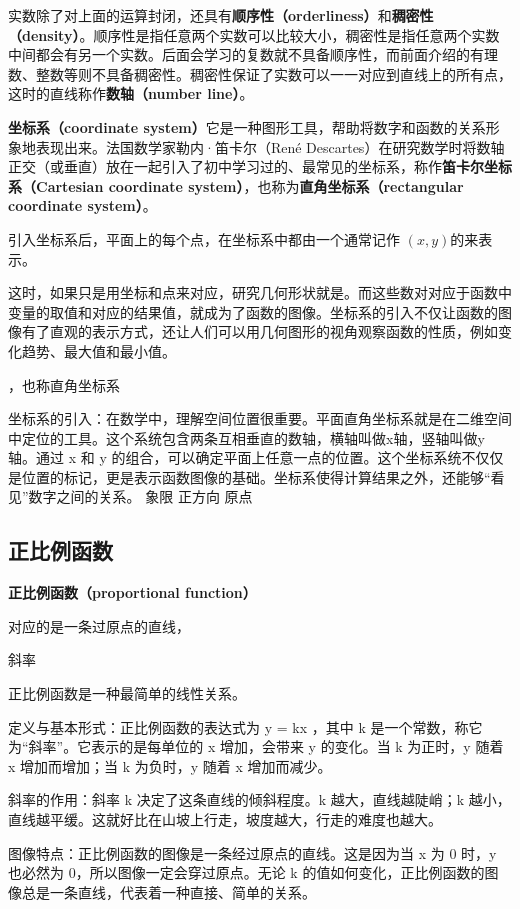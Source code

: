 实数除了对上面的运算封闭，还具有\textbf{顺序性（orderliness）}和\textbf{稠密性（density）}。顺序性是指任意两个实数可以比较大小，稠密性是指任意两个实数中间都会有另一个实数。后面会学习的复数就不具备顺序性，而前面介绍的有理数、整数等则不具备稠密性。稠密性保证了实数可以一一对应到直线上的所有点，这时的直线称作\textbf{数轴（number line）}。

\textbf{坐标系（coordinate system）}它是一种图形工具，帮助将数字和函数的关系形象地表现出来。法国数学家勒内·笛卡尔（René Descartes）在研究数学时将数轴正交（或垂直）放在一起引入了初中学习过的、最常见的坐标系，称作\textbf{笛卡尔坐标系（Cartesian coordinate system）}，也称为\textbf{直角坐标系（rectangular coordinate system）}。

引入坐标系后，平面上的每个点，在坐标系中都由一个通常记作 $(x, y)$的来表示。

这时，如果只是用坐标和点来对应，研究几何形状就是。而这些数对对应于函数中变量的取值和对应的结果值，就成为了函数的图像。坐标系的引入不仅让函数的图像有了直观的表示方式，还让人们可以用几何图形的视角观察函数的性质，例如变化趋势、最大值和最小值。

，也称直角坐标系


坐标系的引入：在数学中，理解空间位置很重要。平面直角坐标系就是在二维空间中定位的工具。这个系统包含两条互相垂直的数轴，横轴叫做x轴，竖轴叫做y轴。通过 x 和 y 的组合，可以确定平面上任意一点的位置。这个坐标系统不仅仅是位置的标记，更是表示函数图像的基础。坐标系使得计算结果之外，还能够“看见”数字之间的关系。
象限
正方向
原点

\subsection{正比例函数}

\textbf{正比例函数（proportional function）}

对应的是一条过原点的直线，

斜率

正比例函数是一种最简单的线性关系。

定义与基本形式：正比例函数的表达式为  y = kx ，其中 k 是一个常数，称它为“斜率”。它表示的是每单位的 x 增加，会带来 y 的变化。当 k 为正时，y 随着 x 增加而增加；当 k 为负时，y 随着 x 增加而减少。

斜率的作用：斜率 k 决定了这条直线的倾斜程度。k 越大，直线越陡峭；k 越小，直线越平缓。这就好比在山坡上行走，坡度越大，行走的难度也越大。

图像特点：正比例函数的图像是一条经过原点的直线。这是因为当 x 为 0 时，y 也必然为 0，所以图像一定会穿过原点。无论 k 的值如何变化，正比例函数的图像总是一条直线，代表着一种直接、简单的关系。

